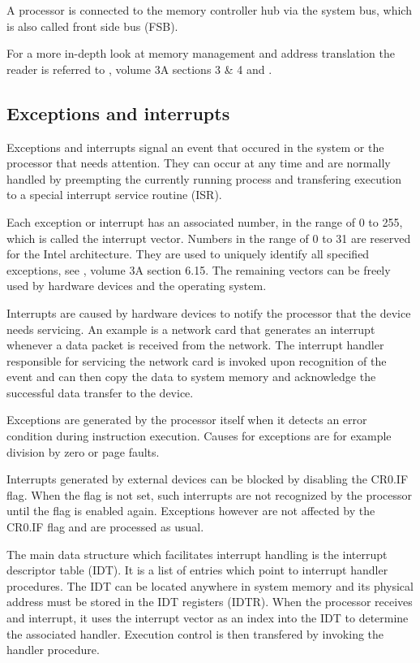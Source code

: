 A processor is connected to the memory controller hub via the system bus, which
is also called front side bus (FSB).

For a more in-depth look at memory management and address translation the reader
is referred to \cite{IntelSDM}, volume 3A sections 3 \& 4 and
\cite{Drepper07whatevery}.

\subsection{Exceptions and interrupts}
Exceptions and interrupts signal an event that occured in the system or the
processor that needs attention. They can occur at any time and are normally
handled by preempting the currently running process and transfering execution to
a special interrupt service routine (ISR).

Each exception or interrupt has an associated number, in the range of 0 to 255,
which is called the interrupt vector. Numbers in the range of 0 to 31 are
reserved for the Intel architecture. They are used to uniquely identify all
specified exceptions, see \cite{IntelSDM}, volume 3A section 6.15. The remaining
vectors can be freely used by hardware devices and the operating system.

Interrupts are caused by hardware devices to notify the processor that the
device needs servicing. An example is a network card that generates an interrupt
whenever a data packet is received from the network. The interrupt handler
responsible for servicing the network card is invoked upon recognition of the
event and can then copy the data to system memory and acknowledge the successful
data transfer to the device.

Exceptions are generated by the processor itself when it detects an error
condition during instruction execution. Causes for exceptions are for example
division by zero or page faults.

Interrupts generated by external devices can be blocked by disabling the CR0.IF
flag. When the flag is not set, such interrupts are not recognized by the
processor until the flag is enabled again. Exceptions however are not affected
by the CR0.IF flag and are processed as usual.

The main data structure which facilitates interrupt handling is the interrupt
descriptor table (IDT). It is a list of entries which point to
interrupt handler procedures. The IDT can be located anywhere in system memory
and its physical address must be stored in the IDT registers (IDTR). When the
processor receives and interrupt, it uses the interrupt vector as an index into
the IDT to determine the associated handler. Execution control is then
transfered by invoking the handler procedure.

